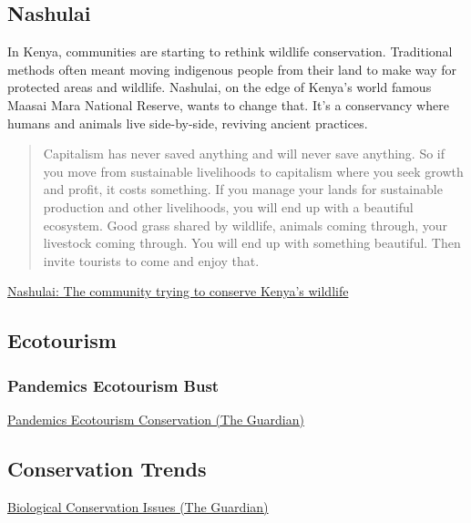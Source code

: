 \documentclass[
]{book}
\begin{document}
\hypertarget{nashulai}{%
\subsection{Nashulai}\label{nashulai}}

In Kenya, communities are starting to rethink wildlife conservation. Traditional methods often meant moving indigenous people from their land to make way for protected areas and wildlife.
Nashulai, on the edge of Kenya's world famous Maasai Mara National Reserve, wants to change that. It's a conservancy where humans and animals live side-by-side, reviving ancient practices.

\begin{quote}
Capitalism has never saved anything and will never save anything.
So if you move from sustainable livelihoods to capitalism where you seek growth and profit,
it costs something. If you manage your lands for sustainable production and other livelihoods,
you will end up with a beautiful ecosystem. Good grass shared by wildlife,
animals coming through, your livestock coming through.
You will end up with something beautiful.
Then invite tourists to come and enjoy that.
\end{quote}

\href{https://www.bbc.com/news/av/world-africa-55477272}{Nashulai: The community trying to conserve Kenya's wildlife}

\hypertarget{ecotourism}{%
\subsection{Ecotourism}\label{ecotourism}}

\hypertarget{pandemics-ecotourism-bust}{%
\subsubsection{Pandemics Ecotourism Bust}\label{pandemics-ecotourism-bust}}

\href{https://www.theguardian.com/environment/2020/dec/30/a-critical-time-how-covid-19-put-the-natural-world-under-pressure-in-2020-aoe}{Pandemics Ecotourism Conservation (The Guardian)}

\hypertarget{conservation-trends}{%
\subsection{Conservation Trends}\label{conservation-trends}}

\href{https://www.theguardian.com/environment/2020/dec/28/seabird-patrols-to-self-healing-buildings-the-15-conservation-stories-to-watch-in-2021}{Biological Conservation Issues (The Guardian)}
\end{document}
